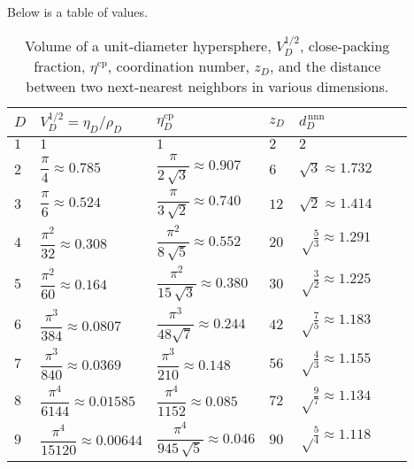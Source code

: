 \documentclass{article}
\begin{document}
Below is a table of values.
\begin{table}[h]
\centering
\renewcommand{\arraystretch}{2.5}
\begin{tabular}{lllllll}
$D$     &   $V^{1/2}_D = \eta_D / \rho_D$
        &   $\eta^\mathrm{cp}_D$
        &   $z_D$
        &   $d^\mathrm{\,nnn}_D$ \\
\hline
$1$     &   $1$
        &   $1$
        &   $2$
        &   $2$
\\
$2$     &   $\dfrac{ \pi } { 4 } \approx 0.785$
        &   $\dfrac{ \pi } { 2 \, \sqrt 3 } \approx 0.907$
        &   $6$
        &   $\sqrt{3} \approx 1.732$
\\
$3$     &   $\dfrac{ \pi } { 6 } \approx 0.524$
        &   $\dfrac{ \pi } { 3 \, \sqrt 2 } \approx 0.740$
        &   $12$
        &   $\sqrt{2} \approx 1.414$
\\
$4$     &   $\dfrac{ \pi^2 } { 32 } \approx 0.308$
        &   $\dfrac{ \pi^2 } { 8 \, \sqrt{5} } \approx 0.552$
        &   $20$
        &   $\sqrt \frac 5 3 \approx 1.291$
\\
$5$     &   $\dfrac{ \pi^2 } { 60 } \approx 0.164$
        &   $\dfrac{ \pi^2 } { 15 \, \sqrt 3 } \approx 0.380$
        &   $30$
        &   $\sqrt \frac 3 2 \approx 1.225$
\\
$6$     &   $\dfrac{ \pi^3 } { 384 } \approx 0.0807$
        &   $\dfrac{ \pi^3 } { 48 \sqrt{7} } \approx 0.244$
        &   $42$
        &   $\sqrt \frac 7 5 \approx 1.183$
\\
$7$     &   $\dfrac{ \pi^3 } { 840 } \approx 0.0369$
        &   $\dfrac{ \pi^3 } { 210 } \approx 0.148$
        &   $56$
        &   $\sqrt \frac 4 3 \approx 1.155$
\\
$8$     &   $\dfrac{ \pi^4 } { 6144 } \approx 0.01585$
        &   $\dfrac{ \pi^4 } { 1152 } \approx 0.085$
        &   $72$
        &   $\sqrt \frac 9 7 \approx 1.134$
\\
$9$     &   $\dfrac{ \pi^4 } { 15120 } \approx 0.00644$
        &   $\dfrac{ \pi^4 } { 945 \, \sqrt 5 } \approx 0.046$
        &   $90$
        &   $\sqrt \frac 5 4 \approx 1.118$
\end{tabular}
\caption{
Volume of a unit-diameter hypersphere,
$V^{1/2}_D$,
close-packing fraction,
$\eta^\mathrm{cp}$,
coordination number,
$z_D$,
and
the distance between two next-nearest neighbors
in various dimensions.}
\end{table}

\end{document}
